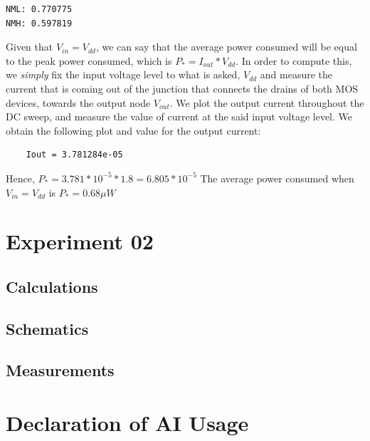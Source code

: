 \documentclass[10pt,letter]{article}
\begin{document}
\begin{verbatim}
NML: 0.770775
NMH: 0.597819
\end{verbatim}

Given that $V_{in} = V_{dd}$, we can say that the average power consumed will be equal to the peak power consumed, which is $P_* = I_{out} * V_{dd}$. In order to compute this, we \emph{simply} fix the input voltage level to what is asked, $V_{dd}$ and measure the current that is coming out of the junction that connects the drains of both MOS devices, towards the output node $V_{out}$. We plot the output current throughout the DC sweep, and measure the value of current at the said input voltage level. We obtain the following plot and value for the output current:



\begin{verbatim}
    Iout = 3.781284e-05
\end{verbatim}

Hence, $P_* = 3.781 * 10^{-5} * 1.8 = 6.805 * 10^{-5}$
The average power consumed when $V_{in} = V_{dd}$ is $P_* = 0.68 \mu W$

\section*{Experiment 02}
\subsection*{Calculations}
\subsection*{Schematics}
\subsection*{Measurements}

\section*{Declaration of AI Usage}
\end{document}
